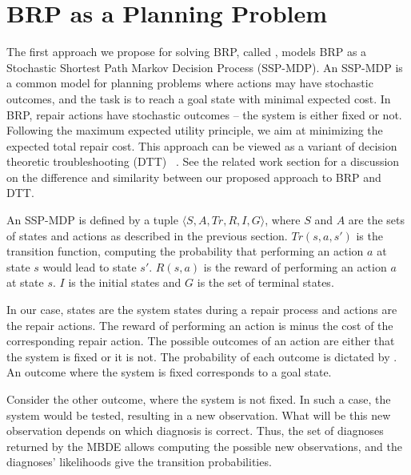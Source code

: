 \section{BRP as a Planning Problem}
The first approach we propose for solving BRP, called \planbased , models BRP as a Stochastic Shortest Path Markov Decision Process (SSP-MDP). An SSP-MDP is a common model for planning problems where actions may have stochastic outcomes, and the task is to reach a goal state with minimal expected cost. In BRP, repair actions have stochastic outcomes -- the system is either fixed or not. Following the maximum expected utility principle, we aim at minimizing the expected total repair cost. This approach can be viewed as a variant of decision theoretic troubleshooting (DTT) ~\cite{heckerman1995decision}. See the related work section for a discussion on the difference and similarity between our proposed approach to BRP and DTT.



An SSP-MDP is defined by a tuple $\langle S,A,Tr,R,I,G \rangle$, where $S$ and $A$ are the sets of states and actions as described in the previous section. $Tr(s,a,s')$ is the transition function, computing the probability that performing an action $a$ at state $s$ would lead to state $s'$. $R(s,a)$ is the reward of performing an action $a$ at state $s$. $I$ is the initial states and $G$ is the set of terminal states.

In our case, states are the system states during a repair process and actions are the repair actions. The reward of performing an action is minus the cost of the corresponding repair action. The possible outcomes of an action are either that the system is fixed or it is not. The probability of each outcome is dictated by \sysrep{()}. An outcome where the system is fixed corresponds to a goal state.%

Consider the other outcome, where the system is not fixed. In such a case, the system would be tested, resulting in a new observation. What will be this new observation depends on which diagnosis is correct. %
Thus, the set of diagnoses returned by the MBDE allows computing the possible new observations, and the diagnoses' likelihoods give the transition probabilities.

